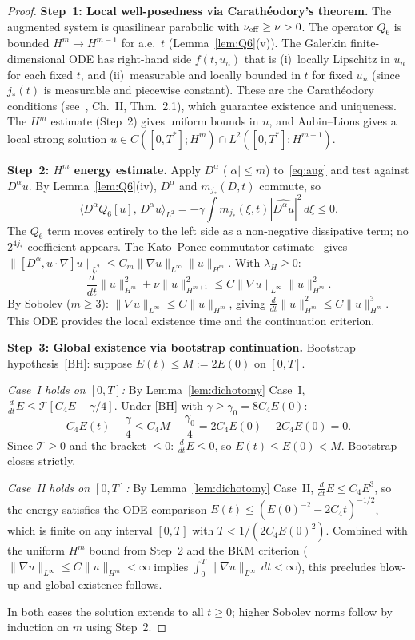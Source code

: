 \documentclass[12pt]{amsart}
\theoremstyle{remark}
\newcommand{\Tcal}{\mathcal{T}}
\newcommand{\lH}{\lambda_H}
\newcommand{\Qsix}{Q_6}
\newcommand{\ip}[2]{\langle #1,\, #2 \rangle}
\begin{document}
\begin{proof}
\textbf{Step~1: Local well-posedness via Carath\'eodory's theorem.}
The augmented system is quasilinear parabolic with $\nu_{\rm eff}\ge\nu>0$.
The operator $\Qsix$ is bounded $H^m\to H^{m-1}$ for a.e.\ $t$
(Lemma~\ref{lem:Q6}(v)).  The Galerkin finite-dimensional ODE has
right-hand side $f(t,u_n)$ that is (i)~locally Lipschitz in $u_n$ for
each fixed $t$, and (ii)~measurable and locally bounded in $t$ for fixed
$u_n$ (since $j_*(t)$ is measurable and piecewise constant).
These are the Carath\'eodory conditions (see~\cite{Hartman}, Ch.~II, Thm.~2.1),
which guarantee existence and uniqueness.
The $H^m$ estimate (Step~2) gives uniform bounds in $n$, and
Aubin--Lions gives a local strong solution
$u\in C([0,T^*];H^m)\cap L^2([0,T^*];H^{m+1})$.

\medskip\noindent
\textbf{Step~2: $H^m$ energy estimate.}
Apply $D^\alpha$ ($|\alpha|\le m$) to~\eqref{eq:aug} and test against
$D^\alpha u$.  By Lemma~\ref{lem:Q6}(iv), $D^\alpha$ and $m_{j_*}(D,t)$
commute, so
\[
  \ip{D^\alpha\Qsix[u]}{D^\alpha u}_{L^2}
  =-\gamma\int m_{j_*}(\xi,t)|\widehat{D^\alpha u}|^2\,d\xi\le 0.
\]
The $\Qsix$ term moves entirely to the left side as a non-negative
dissipative term; no $2^{4j_*}$ coefficient appears.
The Kato--Ponce commutator estimate~\cite{KP88} gives
$\|[D^\alpha,u\cdot\nabla]u\|_{L^2}\le C_m\|\nabla u\|_{L^\infty}\|u\|_{H^m}$.
With $\lH\ge 0$:
\[
  \frac{d}{dt}\|u\|_{H^m}^2+\nu\|u\|_{H^{m+1}}^2
  \le C\|\nabla u\|_{L^\infty}\|u\|_{H^m}^2.
\]
By Sobolev ($m\ge 3$): $\|\nabla u\|_{L^\infty}\le C\|u\|_{H^m}$, giving
$\frac{d}{dt}\|u\|_{H^m}^2\le C\|u\|_{H^m}^3$.
This ODE provides the local existence time and the continuation criterion.

\medskip\noindent
\textbf{Step~3: Global existence via bootstrap continuation.}
Bootstrap hypothesis~[BH]: suppose $E(t)\le M:=2E(0)$ on $[0,T]$.

\smallskip
\textit{Case~I holds on $[0,T]$:}
By Lemma~\ref{lem:dichotomy} Case~I,
$\frac{d}{dt}E\le\Tcal[C_4E-\gamma/4]$.
Under [BH] with $\gamma\ge\gamma_0=8C_4E(0)$:
\[
  C_4E(t)-\frac{\gamma}{4}
  \le C_4M-\frac{\gamma_0}{4}
  = 2C_4E(0)-2C_4E(0)=0.
\]
Since $\Tcal\ge 0$ and the bracket $\le 0$: $\frac{d}{dt}E\le 0$,
so $E(t)\le E(0)<M$.  Bootstrap closes strictly.

\smallskip
\textit{Case~II holds on $[0,T]$:}
By Lemma~\ref{lem:dichotomy} Case~II, $\frac{d}{dt}E\le C_4E^3$,
so the energy satisfies the ODE comparison $E(t)\le(E(0)^{-2}-2C_4t)^{-1/2}$,
which is finite on any interval $[0,T]$ with $T<1/(2C_4E(0)^2)$.
Combined with the uniform $H^m$ bound from Step~2 and the BKM criterion
($\|\nabla u\|_{L^\infty}\le C\|u\|_{H^m}<\infty$ implies
$\int_0^T\|\nabla u\|_{L^\infty}\,dt<\infty$), this precludes blow-up
and global existence follows.

\smallskip
In both cases the solution extends to all $t\ge 0$; higher Sobolev
norms follow by induction on $m$ using Step~2.
\end{proof}
\end{document}
